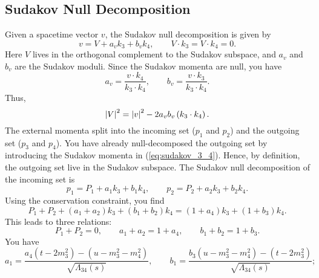 \subsection{Sudakov Null Decomposition}
Given a spacetime vector $v$, the Sudakov null decomposition is given by
\begin{equation}
	v = V + a_{v} k_{3} + b_{v} k_{4}, \qquad V \cdot k_{3} = V \cdot k_{4} = 0.
\end{equation}
Here $V$ lives in the orthogonal complement to the Sudakov subspace, and $a_{v}$ and $b_{v}$ are the Sudakov moduli. Since the Sudakov momenta are null, you have
\begin{equation}
	a_{v} = \frac{v \cdot k_{4}}{k_{3} \cdot k_{4}}, \qquad b_{v} = \frac{v \cdot k_{3}}{k_{3} \cdot k_{4}}.
\end{equation}
Thus,
\begin{equation}
	\left\lvert V \right\rvert^{2} = \left\lvert v \right\rvert^{2} - 2 a_{v} b_{v} \left( k_{3} \cdot k_{4} \right).
\end{equation}
The external momenta split into the incoming set ($p_{1}$ and $p_{2}$) and the outgoing set ($p_{3}$ and $p_{4}$). You have already null-decomposed the outgoing set by introducing the Sudakov momenta in (\ref{eq:sudakov_3_4}). Hence, by definition, the outgoing set live in the Sudakov subspace. The Sudakov null decomposition of the incoming set is
\begin{equation}
	p_{1} = P_{1} + a_{1} k_{3} + b_{1} k_{4}, \qquad p_{2} = P_{2} + a_{2} k_{3} + b_{2} k_{4}.
\end{equation}
Using the conservation constraint, you find
\begin{equation}
	P_{1} + P_{2} + \left( a_{1} + a_{2} \right) k_{3} + \left( b_{1} + b_{2} \right) k_{4} = \left( 1 + a_{4} \right) k_{3} + \left( 1 + b_{3} \right) k_{4}.
\end{equation}
This leads to three relations:
\begin{equation}
	P_{1} + P_{2} = 0, \qquad a_{1} + a_{2} = 1 + a_{4}, \qquad b_{1} + b_{2} = 1 + b_{3}.
	\label{eq:conv_rel}
\end{equation}
You have
\begin{equation}
	a_{1} = \frac{a_{4} \left( t - 2 m_{3}^{2} \right) - \left( u - m_{3}^{2} - m_{4}^{2} \right) }{\sqrt{\Lambda_{34}(s)}}, \qquad
	b_{1} = \frac{b_{3} \left( u - m_{3}^{2} - m_{4}^{2} \right) - \left( t - 2 m_{3}^{2} \right) }{\sqrt{\Lambda_{34}(s)}};
\end{equation}
